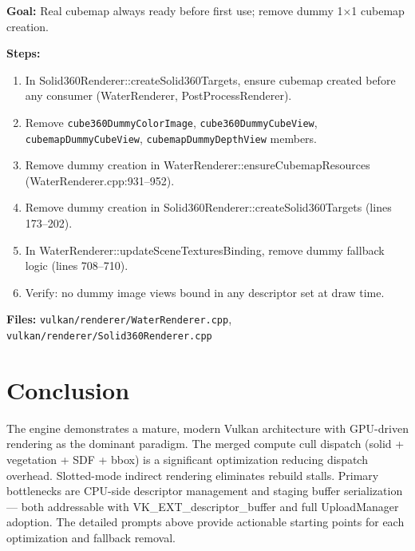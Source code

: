 \documentclass[11pt,a4paper]{article}
\begin{document}
\begin{tcolorbox}[promptbox={Prompt: Remove Cubemap Dummy Resources}]
\textbf{Goal:} Real cubemap always ready before first use; remove dummy 1×1 cubemap creation.

\textbf{Steps:}
\begin{enumerate}
    \item In Solid360Renderer::createSolid360Targets, ensure cubemap created before any consumer (WaterRenderer, PostProcessRenderer).
    \item Remove \texttt{cube360DummyColorImage}, \texttt{cube360DummyCubeView}, \texttt{cubemapDummyCubeView}, \texttt{cubemapDummyDepthView} members.
    \item Remove dummy creation in WaterRenderer::ensureCubemapResources (WaterRenderer.cpp:931–952).
    \item Remove dummy creation in Solid360Renderer::createSolid360Targets (lines 173–202).
    \item In WaterRenderer::updateSceneTexturesBinding, remove dummy fallback logic (lines 708–710).
    \item Verify: no dummy image views bound in any descriptor set at draw time.
\end{enumerate}

\textbf{Files:} \texttt{vulkan/renderer/WaterRenderer.cpp}, \texttt{vulkan/renderer/Solid360Renderer.cpp}
\end{tcolorbox}

\section{Conclusion}

The engine demonstrates a mature, modern Vulkan architecture with GPU-driven rendering as the dominant paradigm. The merged compute cull dispatch (solid + vegetation + SDF + bbox) is a significant optimization reducing dispatch overhead. Slotted-mode indirect rendering eliminates rebuild stalls. Primary bottlenecks are CPU-side descriptor management and staging buffer serialization — both addressable with VK\_EXT\_descriptor\_buffer and full UploadManager adoption. The detailed prompts above provide actionable starting points for each optimization and fallback removal.
\end{document}

